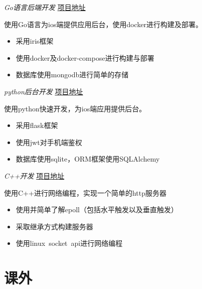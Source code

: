 \documentclass{uniquecv}
\begin{document}
\textit{Go语言后端开发}
\href{https://github.com/colinaaa/hackweek}{项目地址}
\vspace{0.4ex}

使用Go语言为ios端提供应用后台，使用docker进行构建及部署。

\begin{itemize}
  \item 采用iris框架
  \item 使用docker及docker-compose进行构建与部署
  \item 数据库使用mongodb进行简单的存储
\end{itemize}

\textit{python后台开发}
\href{https://github.com/colinaaa/tasks_uniquestudio}{项目地址}

使用python快速开发，为ios端应用提供后台。
\vspace{0.4ex}
\begin{itemize}
		\item 采用flask框架
		\item 使用jwt对手机端鉴权
		\item 数据库使用sqlite，ORM框架使用SQLAlchemy
\end{itemize}

\textit{C++开发}
\href{https://github.com/colinaaa/tasks_uniquestudio}{项目地址}

使用C++进行网络编程，实现一个简单的http服务器
\vspace{0.4ex}

\begin{itemize}
  \item 使用并简单了解epoll（包括水平触发以及垂直触发）
  \item 采取继承方式构建服务器
  \item 使用linux\ socket\ api进行网络编程
\end{itemize}

\section{课外}
\end{document}
